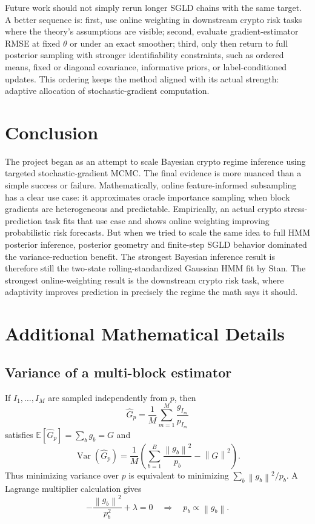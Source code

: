 \documentclass{article}
\newcommand{\E}{\mathbb{E}}
\newcommand{\Var}{\operatorname{Var}}
\newcommand{\1}{\mathbf{1}}
\newcommand{\norm}[1]{\left\lVert #1 \right\rVert}
\begin{document}
Future work should not simply rerun longer SGLD chains with the same target. A better sequence is: first, use online weighting in downstream crypto risk tasks where the theory's assumptions are visible; second, evaluate gradient-estimator RMSE at fixed $\theta$ or under an exact smoother; third, only then return to full posterior sampling with stronger identifiability constraints, such as ordered means, fixed or diagonal covariance, informative priors, or label-conditioned updates. This ordering keeps the method aligned with its actual strength: adaptive allocation of stochastic-gradient computation.

\section{Conclusion}

The project began as an attempt to scale Bayesian crypto regime inference using targeted stochastic-gradient MCMC. The final evidence is more nuanced than a simple success or failure. Mathematically, online feature-informed subsampling has a clear use case: it approximates oracle importance sampling when block gradients are heterogeneous and predictable. Empirically, an actual crypto stress-prediction task fits that use case and shows online weighting improving probabilistic risk forecasts. But when we tried to scale the same idea to full HMM posterior inference, posterior geometry and finite-step SGLD behavior dominated the variance-reduction benefit. The strongest Bayesian inference result is therefore still the two-state rolling-standardized Gaussian HMM fit by Stan. The strongest online-weighting result is the downstream crypto risk task, where adaptivity improves prediction in precisely the regime the math says it should.

\appendix

\section{Additional Mathematical Details}

\subsection{Variance of a multi-block estimator}

If $I_1,\dots,I_M$ are sampled independently from $p$, then
\[
  \widehat G_p
  =
  \frac{1}{M}\sum_{m=1}^M \frac{g_{I_m}}{p_{I_m}}
\]
satisfies $\E[\widehat G_p]=\sum_b g_b=G$ and
\[
  \Var(\widehat G_p)
  =
  \frac{1}{M}
  \left(
  \sum_{b=1}^B \frac{\norm{g_b}^2}{p_b}
  -
  \norm{G}^2
  \right).
\]
Thus minimizing variance over $p$ is equivalent to minimizing $\sum_b \norm{g_b}^2/p_b$. A Lagrange multiplier calculation gives
\[
  -\frac{\norm{g_b}^2}{p_b^2}+\lambda=0
  \quad\Rightarrow\quad
  p_b \propto \norm{g_b}.
\]
\end{document}
